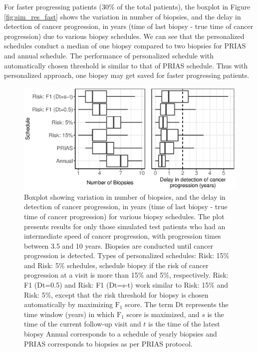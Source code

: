 For faster progressing patients (30\% of the total patients), the boxplot in Figure \ref{fig:sim_res_fast} shows the variation in number of biopsies, and the delay in detection of cancer progression, in years (time of last biopsy - true time of cancer progression) due to various biopsy schedules. We can see that the personalized schedules conduct a median of one biopsy compared to two biopsies for PRIAS and annual schedule. The performance of personalized schedule with automatically chosen threshold is similar to that of PRIAS schedule. Thus with personalized approach, one biopsy may get saved for faster progressing patients.
\begin{figure}[!htb]
\captionsetup{justification=justified}
\centerline{\includegraphics[width=\columnwidth]{images/sim_res_intermediate.eps}}
\caption{Boxplot showing variation in number of biopsies, and the delay in detection of cancer progression, in years (time of last biopsy - true time of cancer progression) for various biopsy schedules. The plot presents results for only those simulated test patients who had an intermediate speed of cancer progression, with progression times between 3.5 and 10 years. Biopsies are conducted until cancer progression is detected. Types of personalized schedules: Risk: 15\% and Risk: 5\% schedules, schedule biopsy if the risk of cancer progression at a visit is more than 15\% and 5\%, respectively. Risk: F1 (Dt=0.5) and Risk: F1 (Dt=s-t) work similar to Risk: 15\% and Risk: 5\%, except that the risk threshold for biopsy is chosen automatically by maximizing $\mbox{F}_1$ score. The term Dt represents the time window (years) in which $\mbox{F}_1$ score is maximized, and $s$ is the time of the current follow-up visit and $t$ is the time of the latest biopsy  Annual corresponds to a schedule of yearly biopsies and PRIAS corresponds to biopsies as per PRIAS protocol.}
\label{fig:sim_res_intermediate}
\end{figure}

